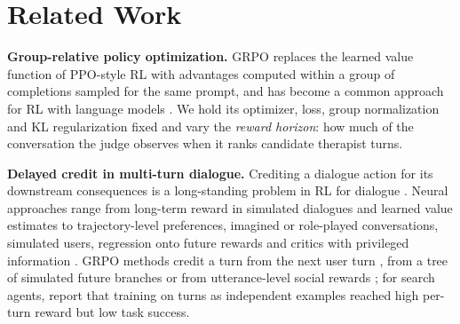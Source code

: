 \section{Related Work}
\label{sec:related}


\textbf{Group-relative policy optimization.}
GRPO \citep{shao2024deepseekmath} replaces the learned value function of PPO-style RL
\citep{schulman2017ppo, ouyang2022instructgpt} with advantages computed within a group of
completions sampled for the same prompt, and has become a common approach for RL with language
models \citep{guo2025deepseekr1}. We hold its optimizer, loss, group normalization and KL
regularization fixed and vary the \emph{reward horizon}: how much of the conversation the judge
observes when it ranks candidate therapist turns.

\textbf{Delayed credit in multi-turn dialogue.}
Crediting a dialogue action for its downstream consequences is a long-standing problem in RL for
dialogue \citep{levin2000stochastic, singh2002optimizing}. Neural approaches range from long-term
reward in simulated dialogues and learned value estimates to trajectory-level preferences, imagined
or role-played conversations, simulated users, regression onto future rewards and critics with
privileged information \citep{li2016deeprl, zhou2024archer, shani2024multiturn, hong2023imagined,
wang2024sotopiapi, qian2025userrl, gao2024refuel, zhou2025sweetrl}. GRPO methods credit a turn from the next user turn \citep{zhao2026faca},
from a tree of simulated future branches \citep{peng2026atgrpo} or from utterance-level social
rewards \citep{yu2025sotopiarl}; for search agents, \citet{wei2025multiturn} report that
training on turns as independent examples reached high per-turn reward but low task success.

